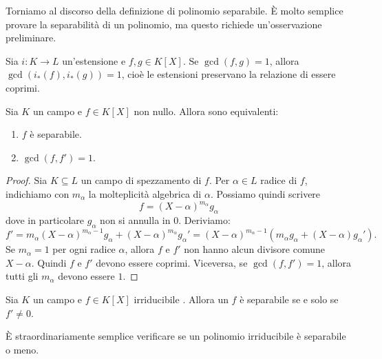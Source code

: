 Torniamo al discorso della definizione di polinomio separabile. È molto semplice provare la separabilità di un polinomio, ma questo richiede un'osservazione preliminare.

\begin{osse}
Sia $i : K \to L$ un'estensione e $f, g \in K[X]$. Se $\gcd(f, g) = 1$, allora $\gcd\left(i_\ast(f), i_\ast(g)\right) = 1$, cioè le estensioni preservano la relazione di essere coprimi.
\end{osse}

\begin{lemm}
Sia $K$ un campo e $f \in K[X]$ non nullo. Allora sono equivalenti:
\begin{enumerate}
\item $f$ è separabile.
\item $\gcd(f, f') = 1$.
\end{enumerate}
\end{lemm}

\begin{proof}
Sia $K \subseteq L$ un campo di spezzamento di $f$. Per $\alpha \in L$ radice di $f$, indichiamo con $m_\alpha$ la molteplicità algebrica di $\alpha$. Possiamo quindi scrivere 
\[f = (X-\alpha)^{m_\alpha} g_\alpha\]
dove in particolare $g_\alpha$ non si annulla in $0$. Deriviamo:
\[f' = m_\alpha (X-\alpha)^{m_\alpha -1}g_\alpha + (X-\alpha)^{m_\alpha} g_\alpha' = (X-\alpha)^{m_\alpha -1} \left(m_\alpha g_\alpha + (X-\alpha)g_\alpha'\right) .\]
Se $m_\alpha = 1$ per ogni radice $\alpha$, allora $f$ e $f'$ non hanno alcun divisore comune $X-\alpha$. Quindi $f$ e $f'$ devono essere coprimi. Viceversa, se $\gcd(f, f') = 1$, allora tutti gli $m_\alpha$ devono essere $1$.
\end{proof}

\begin{prop}
Sia $K$ un campo e $f \in K[X]$ irriducibile . Allora un $f$ è separabile se e solo se $f' \ne 0$.
\end{prop}

È straordinariamente semplice verificare se un polinomio irriducibile è separabile o meno.


